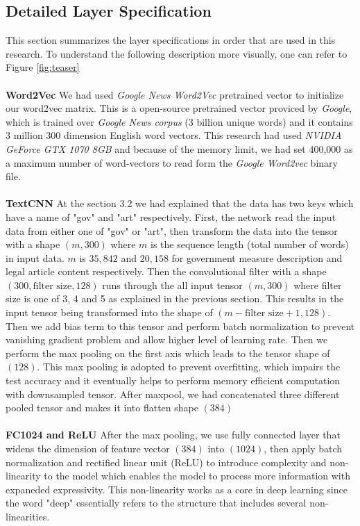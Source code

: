 \documentclass[sigconf]{acmart}
\begin{document}
\subsection{Detailed Layer Specification}
This section summarizes the layer specifications in order that are used in this research. To understand the following description more visually, one can refer to Figure \ref{fig:teaser}\\\\
\textbf{Word2Vec} We had used \textit{Google News Word2Vec} \cite{GoogleWord2vec} pretrained vector to initialize our word2vec matrix. This is a open-source pretrained vector proviced by \textit{Google}, which is trained over \textit{Google News corpus} (3 billion unique words) and it  contains 3 million 300 dimension English word vectors. This research had used \textit{NVIDIA GeForce GTX 1070 8GB} and because of the memory limit, we had set 400,000 as a maximum number of word-vectors to read form the \textit{Google Word2vec} binary file.\\\\
\textbf{TextCNN} At the section 3.2 we had explained that the data has two keys which have a name of "gov" and "art" respectively. First, the network read the input data from either one of "gov" or "art", then transform the data into the tensor with a shape \((m, 300)\) where \(m\) is the sequence length (total number of words) in input data. \(m\) is \(35,842\) and \(20,158\) for government measure description and legal article content respectively. Then the convolutional filter with a shape \((300, \text{filter size}, 128)\) runs through the all input tensor \((m, 300)\) where filter size is one of 3, 4 and 5 as explained in the previous section. This results in the input tensor being transformed into the shape of \((m - \text{filter size} + 1 , 128)\). Then we add bias term to this tensor and perform batch normalization \cite{DBLP:journals/corr/IoffeS15} to prevent vanishing gradient problem and allow higher level of learning rate. Then we perform the max pooling \cite{Ranzato2007} on the first axis which leads to the tensor shape of \((128)\). This max pooling is adopted to prevent overfitting, which impairs the test accuracy and it eventually helps to perform memory efficient computation with downsampled tensor. After maxpool, we had concatenated three different pooled tensor and makes it into flatten shape \((384)\)\\\\
\textbf{FC1024 and ReLU} After the max pooling, we use fully connected layer that widens the dimension of feature vector \((384)\) into \((1024)\), then apply batch normalization and rectified linear unit (ReLU) \cite{pmlr-v15-glorot11a} to introduce complexity and non-linearity to the model which enables the model to process more information with expaneded expressivity. This non-linearity works as a core in deep learning since the word "deep" essentially refers to the structure that includes several non-linearities.\\\\
\end{document}
